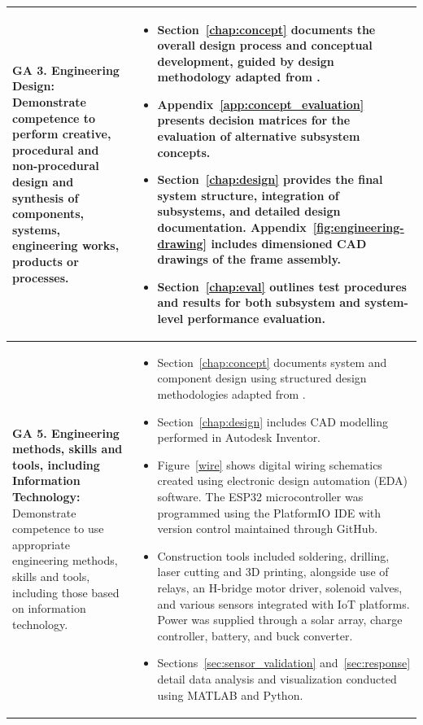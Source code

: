 \begin{longtable}{|p{}|p{}|}
	\textbf{GA 3. Engineering Design:} Demonstrate competence to perform creative, procedural and non-procedural design and synthesis of components, systems, engineering works, products or processes. &
	\begin{itemize}[leftmargin=*, nosep]
		\item Section~\ref{chap:concept} documents the overall design process and conceptual development, guided by design methodology adapted from \cite{Dieter}.
		\item Appendix~\ref{app:concept_evaluation} presents decision matrices for the evaluation of alternative subsystem concepts.
		\item Section~\ref{chap:design} provides the final system structure, integration of subsystems, and detailed design documentation. Appendix~\ref{fig:engineering-drawing} includes dimensioned CAD drawings of the frame assembly.
		\item Section~\ref{chap:eval} outlines test procedures and results for both subsystem and system-level performance evaluation.
	\end{itemize}
	\\ \hline
	
	\textbf{GA 5. Engineering methods, skills and tools, including Information Technology:} Demonstrate competence to use appropriate engineering methods, skills and tools, including those based on information technology. &
	\begin{itemize}[leftmargin=*, nosep]
		\item Section~\ref{chap:concept} documents system and component design using structured design methodologies adapted from \cite{Dieter}.
		\item Section~\ref{chap:design} includes CAD modelling performed in Autodesk Inventor.
		\item Figure~\ref{wire} shows digital wiring schematics created using electronic design automation (EDA) software. The ESP32 microcontroller was programmed using the PlatformIO IDE with version control maintained through GitHub.
		\item Construction tools included soldering, drilling, laser cutting and 3D printing, alongside use of relays, an H-bridge motor driver, solenoid valves, and various sensors integrated with IoT platforms. Power was supplied through a solar array, charge controller, battery, and buck converter.
		\item Sections~\ref{sec:sensor_validation} and~\ref{sec:response} detail data analysis and visualization conducted using MATLAB and Python.
	\end{itemize}
	\\ \hline
	

\end{longtable}
